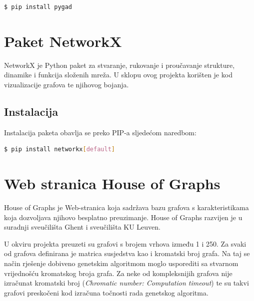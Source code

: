 \documentclass[times, utf8, zavrsni, numeric]{fer}
\begin{document}
\begin{lstlisting}[language=bash, numbers=none]
  $ pip install pygad
\end{lstlisting}

\section{Paket NetworkX}
NetworkX je Python paket za stvaranje, rukovanje i proučavanje strukture, dinamike i funkcija složenih mreža. U sklopu ovog projekta korišten je kod vizualizacije grafova te njihovog bojanja.

\subsection{Instalacija}
Instalacija paketa obavlja se preko PIP-a sljedećom naredbom:

\begin{lstlisting}[language=bash, numbers=none]
  $ pip install networkx[default]
\end{lstlisting}

\section{Web stranica House of Graphs}
\label{sec:house of graphs}
House of Graphs \cite{houseofgraphs} je Web-stranica koja sadržava bazu grafova s karakteristikama koja dozvoljava njihovo besplatno preuzimanje. House of Graphs razvijen je u suradnji sveučilišta Ghent i sveučilišta KU Leuven.

U okviru projekta preuzeti su grafovi s brojem vrhova između 1 i 250. Za svaki od grafova definirana je matrica susjedstva kao i kromatski broj grafa. Na taj se način rješenje dobiveno genetskim algoritmom moglo usporediti sa stvarnom vrijednošću kromatskog broja grafa. Za neke od kompleksnijih grafova nije izračunat kromatski broj (\textit{Chromatic number: Computation timeout}) te su takvi grafovi preskočeni kod izračuna točnosti rada genetskog algoritma.
\end{document}
